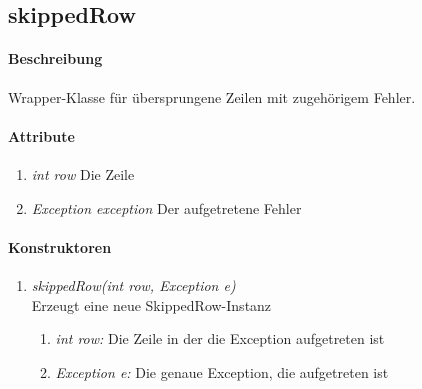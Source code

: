 \subsection*{skippedRow}\label{srow}

\paragraph{Beschreibung}
Wrapper-Klasse für übersprungene Zeilen mit zugehörigem Fehler.


\paragraph{Attribute}

\begin{enumerate}[$\bullet$]
	\item \textit{int row} Die Zeile
	\item \textit{Exception exception} Der aufgetretene Fehler
\end{enumerate}



\paragraph{Konstruktoren}
\begin{enumerate}[+]
	\item \textit{skippedRow(int row, Exception e)} \\
	Erzeugt eine neue SkippedRow-Instanz
	\begin{enumerate}[$\bullet$]
		\item \textit{int row:} Die Zeile in der die Exception aufgetreten ist
		\item \textit{Exception e:} Die genaue Exception, die aufgetreten ist
	\end{enumerate}	
\end{enumerate}

